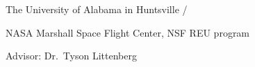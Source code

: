 The University of Alabama in Huntsville / 

NASA Marshall Space Flight Center, NSF REU program 

Advisor: Dr.\ Tyson Littenberg



